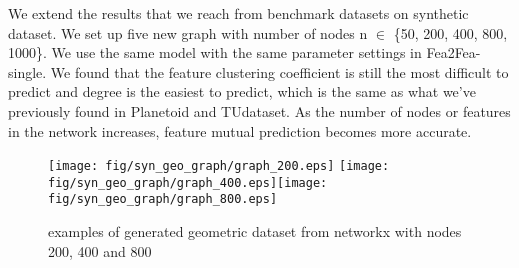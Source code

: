 \documentclass[runningheads]{llncs}
\begin{document}
We extend the results that we reach from benchmark datasets on synthetic dataset. We set up five new graph with number of nodes n $\in$ \{50, 200, 400, 800, 1000\}. We use the same model with the same parameter settings in Fea2Fea-single. We found that the feature clustering coefficient is still the most difficult to predict and degree is the easiest to predict, which is the same as what we've previously found in Planetoid and TUdataset. As the number of nodes or features in the network increases, feature mutual prediction becomes more accurate.
  \begin{figure}[!htp]
    \centering
    \begin{center}
    \hspace*{-1in}
        \texttt{[image: fig/syn\_geo\_graph/graph\_200.eps]}
        \texttt{[image: fig/syn\_geo\_graph/graph\_400.eps]}\texttt{[image: fig/syn\_geo\_graph/graph\_800.eps]}
        \hspace*{-1in}
        \caption{examples of generated geometric dataset from networkx with nodes 200, 400 and 800}
      \end{center}
    \end{figure}
\end{document}
